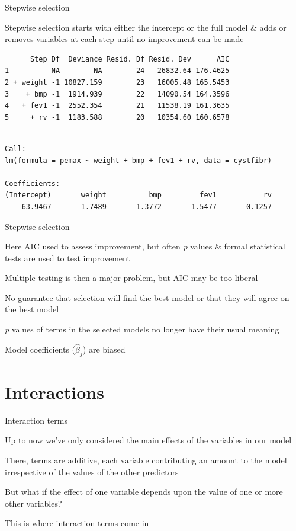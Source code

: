 \documentclass[10pt,ignorenonframetext,compress, aspectratio=169]{beamer}
\begin{document}
\begin{frame}[fragile]{Stepwise selection}

Stepwise selection starts with either the intercept or the full model \&
adds or removes variables at each step until no improvement can be made

\scriptsize

\begin{verbatim}
      Step Df  Deviance Resid. Df Resid. Dev      AIC
1          NA        NA        24   26832.64 176.4625
2 + weight -1 10827.159        23   16005.48 165.5453
3    + bmp -1  1914.939        22   14090.54 164.3596
4   + fev1 -1  2552.354        21   11538.19 161.3635
5     + rv -1  1183.588        20   10354.60 160.6578
\end{verbatim}

\begin{verbatim}

Call:
lm(formula = pemax ~ weight + bmp + fev1 + rv, data = cystfibr)

Coefficients:
(Intercept)       weight          bmp         fev1           rv  
    63.9467       1.7489      -1.3772       1.5477       0.1257  
\end{verbatim}

\normalsize

\end{frame}

\begin{frame}{Stepwise selection}

Here AIC used to assess improvement, but often \emph{p} values \& formal
statistical tests are used to test improvement

Multiple testing is then a major problem, but AIC may be too liberal

No guarantee that selection will find the best model or that they will
agree on the best model

\emph{p} values of terms in the selected models no longer have their
usual meaning

Model coefficients (\(\hat{\beta}_j\)) are biased

\end{frame}

\section{Interactions}\label{interactions}

\begin{frame}{Interaction terms}

Up to now we've only considered the \alert{main effects} of the
variables in our model

There, terms are \alert{additive}, each variable contributing an amount
to the model irrespective of the values of the other predictors

But what if the effect of one variable depends upon the value of one or
more other variables?

This is where \alert{interaction terms} come in

\end{frame}
\end{document}
